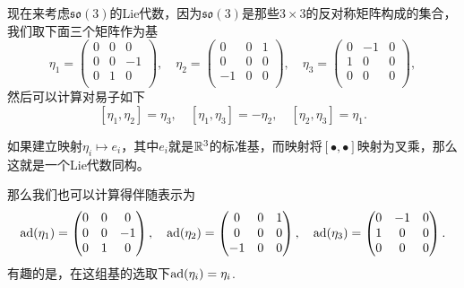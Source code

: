 现在来考虑$\mathfrak{so}(3)$的Lie代数，因为$\mathfrak{so}(3)$是那些$3\times 3$的反对称矩阵构成的集合，我们取下面三个矩阵作为基
\[
	\eta_1=
		\begin{pmatrix}
			0&0&0\\
			0&0&-1\\
			0&1&0\\
		\end{pmatrix},\quad
	\eta_2=
		\begin{pmatrix}
			0&0&1\\
			0&0&0\\
			-1&0&0\\
		\end{pmatrix},\quad
	\eta_3=
		\begin{pmatrix}
			0&-1&0\\
			1&0&0\\
			0&0&0\\
		\end{pmatrix},
\]
然后可以计算对易子如下
\[
	[\eta_1,\eta_2]=\eta_3,\quad [\eta_1,\eta_3]=-\eta_2,\quad [\eta_2,\eta_3]=\eta_1.
\]

如果建立映射$\eta_i\mapsto e_i$，其中$e_i$就是$\mathbb{R}^3$的标准基，而映射将$[\bullet,\bullet]$映射为叉乘，那么这就是一个Lie代数同构。

那么我们也可以计算得伴随表示为
\[
	\operatorname{ad}(\eta_1)=
		\begin{pmatrix}
			0&0&0\\
			0&0&-1\\
			0&1&0\\
		\end{pmatrix},\quad
	\operatorname{ad}(\eta_2)=
		\begin{pmatrix}
			0&0&1\\
			0&0&0\\
			-1&0&0\\
		\end{pmatrix},\quad
	\operatorname{ad}(\eta_3)=
		\begin{pmatrix}
			0&-1&0\\
			1&0&0\\
			0&0&0\\
		\end{pmatrix}.
\]
有趣的是，在这组基的选取下$\operatorname{ad}(\eta_i)=\eta_i$.

